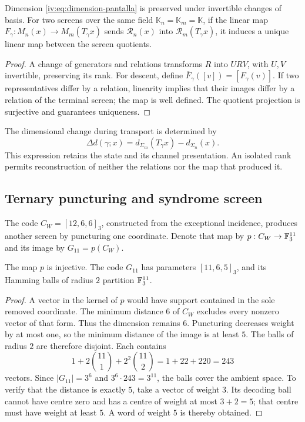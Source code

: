 \begin{proposition}
\label{iv:prop:pantalla-transporte}
Dimension \eqref{iv:eq:dimension-pantalla} is preserved
under invertible changes of basis. For two screens over the same field
\(\mathbb K_n=\mathbb K_m=\mathbb K\), if the linear map
\(F_\gamma:M_n(x)\to M_m(T_\gamma x)\) sends
\(\mathcal R_n(x)\) into \(\mathcal R_m(T_\gamma x)\), it induces
a unique linear map between the screen quotients.
\end{proposition}
\begin{proof}
A change of generators and relations transforms \(R\) into
\(URV\), with \(U,V\) invertible, preserving its rank. For
descent, define
\(\overline F_\gamma([v])=[F_\gamma(v)]\). If two
representatives differ by a relation, linearity implies that their images differ
by a relation of the terminal screen; the map is
well defined. The quotient projection is surjective and
guarantees uniqueness.
\end{proof}

The dimensional change during transport is determined
by
\[
 \Delta d(\gamma;x)=d_{\Sigma_m}(T_\gamma x)
                         -d_{\Sigma_n}(x).
\]
This expression retains the state and its channel presentation.
An isolated rank permits reconstruction of neither the relations nor
the map that produced it.

\subsection{Ternary puncturing and syndrome screen}

The code \(C_W=[12,6,6]_3\), constructed from the
exceptional incidence, produces another screen by
puncturing one coordinate. Denote that map by
\(p:C_W\to\mathbb F_3^{11}\) and its image by
\(G_{11}=p(C_W)\).

\begin{proposition}
\label{iv:prop:codigo-once}
The map \(p\) is injective. The code \(G_{11}\) has
parameters \([11,6,5]_3\), and its Hamming balls of radius
\(2\) partition \(\mathbb F_3^{11}\).
\end{proposition}
\begin{proof}
A vector in the kernel of \(p\) would have support contained in
the sole removed coordinate. The minimum distance \(6\)
of \(C_W\) excludes every nonzero vector of that form.
Thus the dimension remains \(6\). Puncturing decreases
weight by at most one, so the minimum distance
of the image is at least \(5\). The balls of radius \(2\)
are therefore disjoint. Each contains
\[
 1+2\binom{11}{1}+2^2\binom{11}{2}
 =1+22+220=243
\]
vectors. Since \(|G_{11}|=3^6\) and
\(3^6\cdot243=3^{11}\), the balls cover the ambient space.
To verify that the distance is exactly \(5\),
take a vector of weight \(3\). Its decoding ball
cannot have centre zero and has a centre of weight at
most \(3+2=5\); that centre must have weight at least
\(5\). A word of weight \(5\) is thereby obtained.
\end{proof}

